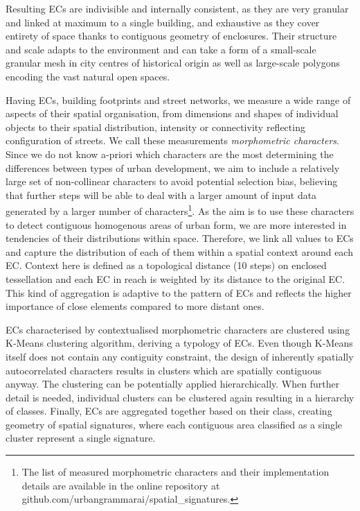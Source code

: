 Resulting ECs are indivisible and internally consistent, as they are very granular and
linked at maximum to a single building, and exhaustive as they cover entirety of space
thanks to contiguous geometry of enclosures. Their structure and scale adapts to the
environment and can take a form of a small-scale granular mesh in city centres of
historical origin as well as large-scale polygons encoding the vast natural open spaces.

Having ECs, building footprints and street networks, we measure a wide range of aspects
of their spatial organisation, from dimensions and shapes of individual objects to their
spatial distribution, intensity or connectivity reflecting configuration of streets. We
call these measurements \textit{morphometric characters}. Since we do not know a-priori
which characters are the most determining the differences between types of urban
development, we aim to include a relatively large set of non-collinear characters to
avoid potential selection bias, believing that further steps will be able to deal with a
larger amount of input data generated by a larger number of characters\footnote{The list
of measured morphometric characters and their implementation details are available in
the online repository at github.com/urbangrammarai/spatial\_signatures.}. As the aim is
to use these characters to detect contiguous homogenous areas of urban form, we are more
interested in tendencies of their distributions within space. Therefore, we link all
values to ECs and capture the distribution of each of them within a spatial context
around each EC. Context here is defined as a topological distance (10 steps) on enclosed
tessellation and each EC in reach is weighted by its distance to the original EC. This
kind of aggregation is adaptive to the pattern of ECs and reflects the higher importance
of close elements compared to more distant ones.

ECs characterised by contextualised morphometric characters are clustered using K-Means
clustering algorithm, deriving a typology of ECs. Even though K-Means itself does not
contain any contiguity constraint, the design of inherently spatially autocorrelated
characters results in clusters which are spatially contiguous anyway. The clustering can
be potentially applied hierarchically. When further detail is needed, individual
clusters can be clustered again resulting in a hierarchy of classes. Finally, ECs are
aggregated together based on their class, creating geometry of spatial signatures, where
each contiguous area classified as a single cluster represent a single signature.

